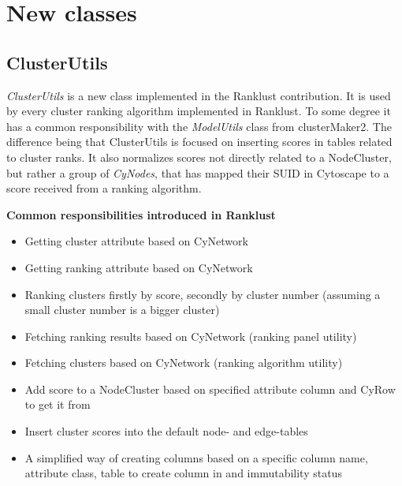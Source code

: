 \section{New classes}
\subsection{ClusterUtils}
\textit{ClusterUtils} is a new class implemented in the Ranklust contribution.
It is used by every cluster ranking algorithm implemented in Ranklust. To some
degree it has a common responsibility with the \textit{ModelUtils} class from
clusterMaker2. The difference being that ClusterUtils is focused on inserting
scores in tables related to cluster ranks. It also normalizes scores not
directly related to a NodeCluster, but rather a group of \textit{CyNodes}, that
has mapped their SUID in Cytoscape to a score received from a ranking algorithm.

\textbf{Common responsibilities introduced in Ranklust}

\begin{itemize}
    \item Getting cluster attribute based on CyNetwork
    \item Getting ranking attribute based on CyNetwork
    \item Ranking clusters firstly by score, secondly by cluster number
        (assuming a small cluster number is a bigger cluster)
    \item Fetching ranking results based on CyNetwork (ranking panel utility)
    \item Fetching clusters based on CyNetwork (ranking algorithm utility)
    \item Add score to a NodeCluster based on specified attribute column and
        CyRow to get it from
    \item Insert cluster scores into the default node- and edge-tables
    \item A simplified way of creating columns based on a specific column name,
        attribute class, table to create column in and immutability status
\end{itemize}


